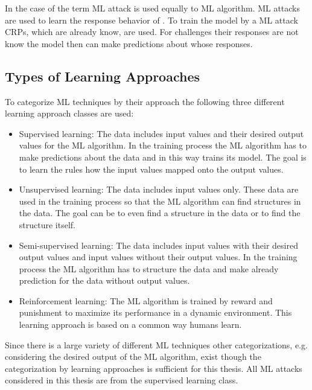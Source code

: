 In the case of \pufs the term \ac{ML} attack is used equally to \ac{ML} algorithm.
\ac{ML} attacks are used to learn the response behavior of \pufs.
To train the model by a \ac{ML} attack \acp{CRP}, which are already know, are used.
For challenges their responses are not know the model then can make predictions about whose responses.


\subsection{Types of Learning Approaches}

To categorize \ac{ML} techniques by their approach the following three different learning approach classes are used: %

\begin{itemize}
\item Supervised learning: The data includes input values and their desired output values for the \ac{ML} algorithm. 
In the training process the \ac{ML} algorithm has to make predictions about the data and in this way trains its model.
The goal is to learn the rules how the input values mapped onto the output values.
\item Unsupervised learning: The data includes input values only.
These data are used in the training process so that the \ac{ML} algorithm can find structures in the data.
The goal can be to even find a structure in the data or to find the structure itself.
\item Semi-supervised learning: The data includes input values with their desired output values and input values without their output values. %
In the training process the \ac{ML} algorithm has to structure the data and make already prediction for the data without output values.
\item Reinforcement learning: The \ac{ML} algorithm is trained by reward and punishment to maximize its performance in a dynamic environment.
This learning approach is based on a common way humans learn.
\end{itemize}

Since there is a large variety of different \ac{ML} techniques other categorizations, e.g. considering the desired output of the \ac{ML} algorithm, exist though the categorization by learning approaches is sufficient for this thesis. %
All \ac{ML} attacks considered in this thesis are from the supervised learning class.







